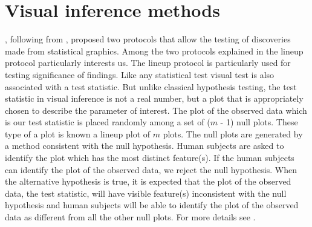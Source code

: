 \documentclass[12]{article}
\begin{document}
%
%
%
%
%
%

\section{Visual inference methods} \label{sec:inference}

\cite{buja:2009}, following from \cite{gelman:2004}, proposed two protocols that allow the testing of discoveries made from statistical graphics. Among the two protocols explained in \cite{buja:2009} the lineup protocol particularly interests us. The lineup protocol is particularly used for testing significance of findings. Like any statistical test visual test is also associated with a test statistic. But unlike classical hypothesis testing, the test statistic in visual inference is not a real number, but a plot that is appropriately chosen to describe the parameter of interest. The plot of the observed data which is our test statistic is placed randomly among a set of ($m$ - 1) null plots. These type of a plot is known a lineup plot of $m$ plots. The null plots are generated by a method consistent with the null hypothesis. Human subjects are asked to identify the plot which has the most distinct feature(s). If the human subjects can identify the plot of the observed data, we reject the null hypothesis. When the alternative hypothesis is true, it is expected that the plot of the observed data, the test statistic, will have visible feature(s) inconsistent with the null hypothesis and human subjects will be able to identify the plot of the observed data as different from all the other null plots. For more details see \cite{buja:2009}. 
\end{document}
